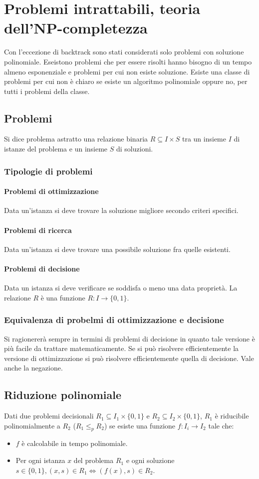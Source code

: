 \chapter{Problemi intrattabili, teoria dell'NP-completezza}
Con l'eccezione di backtrack sono stati considerati solo problemi con soluzione polinomiale. Eseistono problemi che per essere risolti hanno bisogno di un tempo almeno esponenziale e 
problemi per cui non esiste soluzione. Esiste una classe di problemi per cui non \`e chiaro se esiste un algoritmo polinomiale oppure no, per tutti i problemi della classe.
\section{Problemi}
Si dice problema astratto una relazione binaria $R\subseteq I\times S$ tra un insieme $I$ di istanze del problema e un insieme $S$ di soluzioni.
\subsection{Tipologie di problemi}
\subsubsection{Problemi di ottimizzazione}
Data un'istanza si deve trovare la soluzione migliore secondo criteri specifici.
\subsubsection{Problemi di ricerca}
Data un'istanza si deve trovare una possibile soluzione fra quelle esistenti.
\subsubsection{Problemi di decisione}
Data un istanza si deve verificare se soddisfa o meno una data propriet\`a. La relazione $R$ \`e una funzione $R:I\rightarrow\{0, 1\}$.	
\subsection{Equivalenza di probelmi di ottimizzazione e decisione}
Si ragionerer\`a sempre in termini di problemi di decisione in quanto tale versione \`e pi\`u facile da trattare matematicamente. Se si pu\`o risolvere efficientemente la versione
di ottimizzazione si pu\`o risolvere efficientemente quella di decisione. Vale anche la negazione. 
\section{Riduzione polinomiale}
Dati due problemi decisionali $R_1\subseteq I_1\times\{0, 1\}$ e $R_2\subseteq I_2\times\{0, 1\}$, $R_1$ \`e riducibile polinomialmente a $R_2$ ($R_1\le_p R_2$) se esiste una funzione
$f:I_i\rightarrow I_2$ tale che:
\begin{itemize}
	\item $f$ \`e calcolabile in tempo polinomiale.
	\item Per ogni istanza $x$ del problema $R_1$ e ogni soluzione $s\in \{0, 1\}, (x, s)\in R_1\Leftrightarrow (f(x), s)\in R_2$.
\end{itemize}
